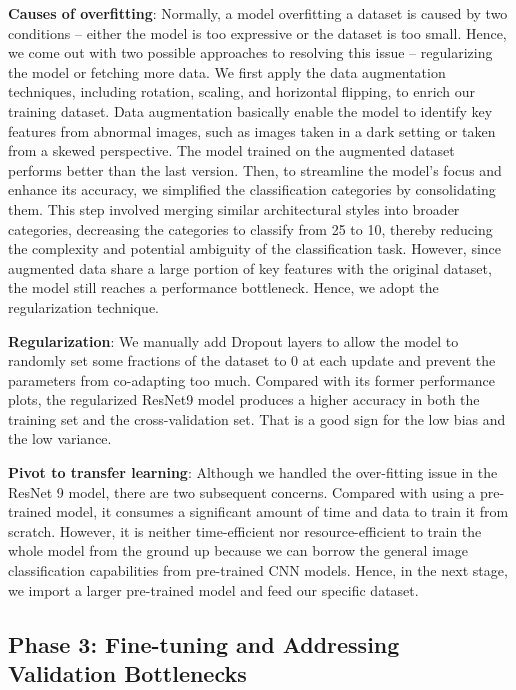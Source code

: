 \documentclass{article}
\begin{document}
\textbf{Causes of overfitting}: Normally, a model overfitting a dataset is caused by two conditions -- either the model is too expressive or the dataset is too small. Hence, we come out with two possible approaches to resolving this issue -- regularizing the model or fetching more data. We first apply the data augmentation techniques, including rotation, scaling, and horizontal flipping, to enrich our training dataset. Data augmentation basically enable the model to identify key features from abnormal images, such as images taken in a dark setting or taken from a skewed perspective. The model trained on the augmented dataset performs better than the last version. Then, to streamline the model's focus and enhance its accuracy, we simplified the classification categories by consolidating them. This step involved merging similar architectural styles into broader categories, decreasing the categories to classify from 25 to 10, thereby reducing the complexity and potential ambiguity of the classification task. However, since augmented data share a large portion of key features with the original dataset, the model still reaches a performance bottleneck. Hence, we adopt the regularization technique.

\textbf{Regularization}: We manually add Dropout layers to allow the model to randomly set some fractions of the dataset to 0 at each update and prevent the parameters from co-adapting too much. Compared with its former performance plots, the regularized ResNet9 model produces a higher accuracy in both the training set and the cross-validation set. That is a good sign for the low bias and the low variance.

\textbf{Pivot to transfer learning}: Although we handled the over-fitting issue in the ResNet 9 model, there are two subsequent concerns. Compared with using a pre-trained model, it consumes a significant amount of time and data to train it from scratch. However, it is neither time-efficient nor resource-efficient to train the whole model from the ground up because we can borrow the general image classification capabilities from pre-trained CNN models. Hence, in the next stage, we import a larger pre-trained model and feed our specific dataset.


\subsection{Phase 3: Fine-tuning and Addressing Validation Bottlenecks}

\end{document}
